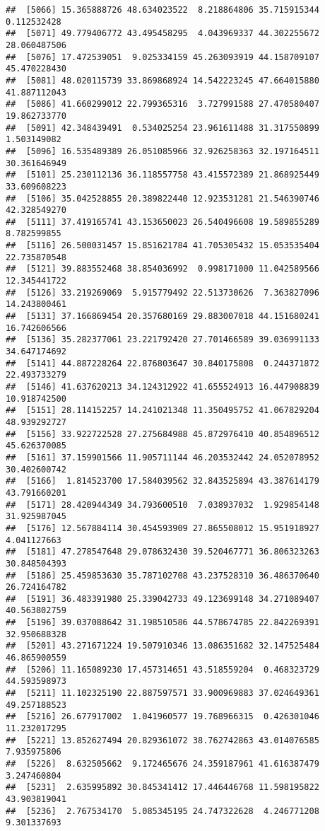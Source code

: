 \documentclass[
]{article}
\begin{document}
\begin{verbatim}
##  [5066] 15.365888726 48.634023522  8.218864806 35.715915344  0.112532428
##  [5071] 49.779406772 43.495458295  4.043969337 44.302255672 28.060487506
##  [5076] 17.472539051  9.025334159 45.263093919 44.158709107 45.470228430
##  [5081] 48.020115739 33.869868924 14.542223245 47.664015880 41.887112043
##  [5086] 41.660299012 22.799365316  3.727991588 27.470580407 19.862733770
##  [5091] 42.348439491  0.534025254 23.961611488 31.317550899  1.503149082
##  [5096] 16.535489389 26.051085966 32.926258363 32.197164511 30.361646949
##  [5101] 25.230112136 36.118557758 43.415572389 21.868925449 33.609608223
##  [5106] 35.042528855 20.389822440 12.923531281 21.546390746 42.328549270
##  [5111] 37.419165741 43.153650023 26.540496608 19.589855289  8.782599855
##  [5116] 26.500031457 15.851621784 41.705305432 15.053535404 22.735870548
##  [5121] 39.883552468 38.854036992  0.998171000 11.042589566 12.345441722
##  [5126] 33.219269069  5.915779492 22.513730626  7.363827096 14.243800461
##  [5131] 37.166869454 20.357680169 29.883007018 44.151680241 16.742606566
##  [5136] 35.282377061 23.221792420 27.701466589 39.036991133 34.647174692
##  [5141] 44.887228264 22.876803647 30.840175808  0.244371872 22.493733279
##  [5146] 41.637620213 34.124312922 41.655524913 16.447908839 10.918742500
##  [5151] 28.114152257 14.241021348 11.350495752 41.067829204 48.939292727
##  [5156] 33.922722528 27.275684988 45.872976410 40.854896512 45.626370085
##  [5161] 37.159901566 11.905711144 46.203532442 24.052078952 30.402600742
##  [5166]  1.814523700 17.584039562 32.843525894 43.387614179 43.791660201
##  [5171] 28.420944349 34.793600510  7.038937032  1.929854148 31.925987045
##  [5176] 12.567884114 30.454593909 27.865508012 15.951918927  4.041127663
##  [5181] 47.278547648 29.078632430 39.520467771 36.806323263 30.848504393
##  [5186] 25.459853630 35.787102708 43.237528310 36.486370640 26.724164782
##  [5191] 36.483391980 25.339042733 49.123699148 34.271089407 40.563802759
##  [5196] 39.037088642 31.198510586 44.578674785 22.842269391 32.950688328
##  [5201] 43.271671224 19.507910346 13.086351682 32.147525484 46.865900559
##  [5206] 11.165089230 17.457314651 43.518559204  0.468323729 44.593598973
##  [5211] 11.102325190 22.887597571 33.900969883 37.024649361 49.257188523
##  [5216] 26.677917002  1.041960577 19.768966315  0.426301046 11.232017295
##  [5221] 13.852627494 20.829361072 38.762742863 43.014076585  7.935975806
##  [5226]  8.632505662  9.172465676 24.359187961 41.616387479  3.247460804
##  [5231]  2.635995892 30.845341412 17.446446768 11.598195822 43.903819041
##  [5236]  2.767534170  5.085345195 24.747322628  4.246771208  9.301337693

\end{verbatim}
\end{document}

